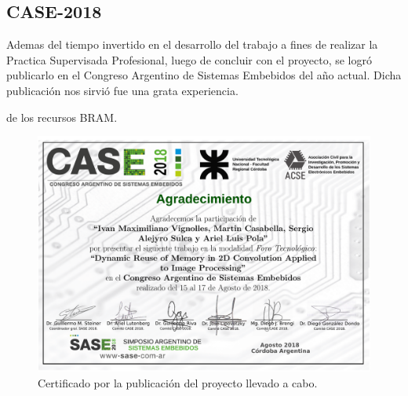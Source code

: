 \documentclass[a4paper]{article}
\begin{document}
\subsection{CASE-2018}
Ademas del tiempo invertido en el desarrollo del trabajo a fines de realizar la Practica Supervisada Profesional, luego de concluir con el proyecto, se logró publicarlo en
el Congreso Argentino de Sistemas Embebidos del año actual. Dicha publicación nos sirvió fue una grata experiencia.



de los recursos BRAM. 
\begin{figure}[H]
\centering
\includegraphics[scale=0.5]{certificado_CASE}
\caption{Certificado por la publicación del proyecto llevado a cabo.}
\label{CASE}
\end{figure}
\end{document}
